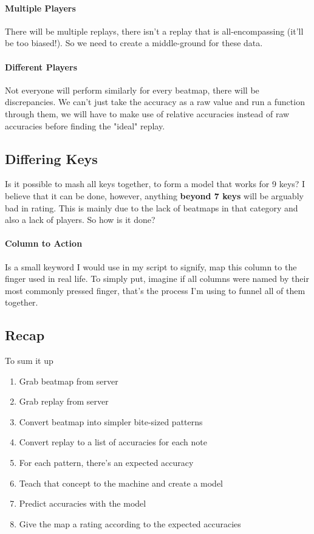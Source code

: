 \documentclass{article}
\begin{document}
\paragraph{Multiple Players} There will be multiple replays, there isn't a replay that is all-encompassing (it'll be too biased!). So we need to create a middle-ground for these data.

\paragraph{Different Players} Not everyone will perform similarly for every beatmap, there will be discrepancies. We can't just take the accuracy as a raw value and run a function through them, we will have to make use of relative accuracies instead of raw accuracies before finding the "ideal" replay.

\subsection{Differing Keys}

Is it possible to mash all keys together, to form a model that works for 9 keys? I believe that it can be done, however, anything \textbf{beyond 7 keys} will be arguably bad in rating. This is mainly due to the lack of beatmaps in that category and also a lack of players. So how is it done?

\paragraph{Column to Action} Is a small keyword I would use in my script to signify, map this column to the finger used in real life. To simply put, imagine if all columns were named by their most commonly pressed finger, that's the process I'm using to funnel all of them together.

\subsection{Recap}

To sum it up

\begin{enumerate}
	\item Grab beatmap from server
	\item Grab replay from server
	\item Convert beatmap into simpler bite-sized patterns
	\item Convert replay to a list of accuracies for each note
	\item For each pattern, there's an expected accuracy
	\item Teach that concept to the machine and create a model
	\item Predict accuracies with the model
	\item Give the map a rating according to the expected accuracies
\end{enumerate}
\end{document}
